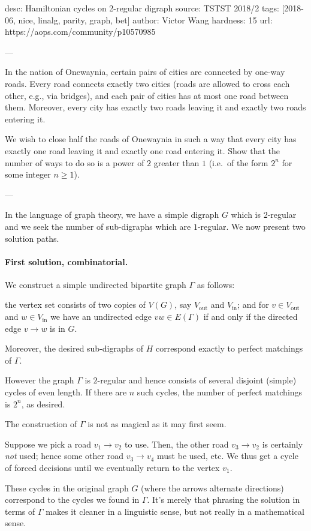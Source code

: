 desc: Hamiltonian cycles on 2-regular digraph
source: TSTST 2018/2
tags: [2018-06, nice, linalg, parity, graph, bet]
author: Victor Wang
hardness: 15
url: https://aops.com/community/p10570985

---

In the nation of Onewaynia,
certain pairs of cities are connected by one-way roads.
Every road connects exactly two cities
(roads are allowed to cross each other, e.g., via bridges),
and each pair of cities has at most one road between them.
Moreover, every city has exactly two roads leaving it and
exactly two roads entering it.

We wish to close half the roads of Onewaynia in such a way that
every city has exactly one road leaving it and exactly one road entering it.
Show that the number of ways to do so is a power of $2$ greater than $1$
(i.e.\ of the form $2^n$ for some integer $n \ge 1$).

---

In the language of graph theory, we have a simple digraph $G$
which is 2-regular and we seek the
number of sub-digraphs which are $1$-regular.
We now present two solution paths.

\paragraph{First solution, combinatorial.}
We construct a simple undirected bipartite graph $\Gamma$ as follows:
\begin{itemize}
  \ii the vertex set consists of two copies of $V(G)$,
  say $V_{\text{out}}$ and $V_{\text{in}}$; and
  \ii for $v \in V_{\text{out}}$ and $w \in V_{\text{in}}$
  we have an undirected edge $vw \in E(\Gamma)$
  if and only if the directed edge $v \to w$ is in $G$.
\end{itemize}
Moreover, the desired sub-digraphs of $H$ correspond exactly
to perfect matchings of $\Gamma$.

However the graph $\Gamma$ is $2$-regular
and hence consists of several disjoint (simple) cycles of even length.
If there are $n$ such cycles, the number of perfect matchings
is $2^n$, as desired.

\begin{remark*}
  The construction of $\Gamma$ is not as magical as it may first seem.

  Suppose we pick a road $v_1 \to v_2$ to use.
  Then, the other road $v_3 \to v_2$ is certainly \emph{not} used;
  hence some other road $v_3 \to v_4$ must be used, etc.
  We thus get a cycle of forced decisions until
  we eventually return to the vertex $v_1$.

  These cycles in the original graph $G$
  (where the arrows alternate directions)
  correspond to the cycles we found in $\Gamma$.
  It's merely that phrasing the solution in terms of $\Gamma$
  makes it cleaner in a linguistic sense,
  but not really in a mathematical sense.
\end{remark*}

